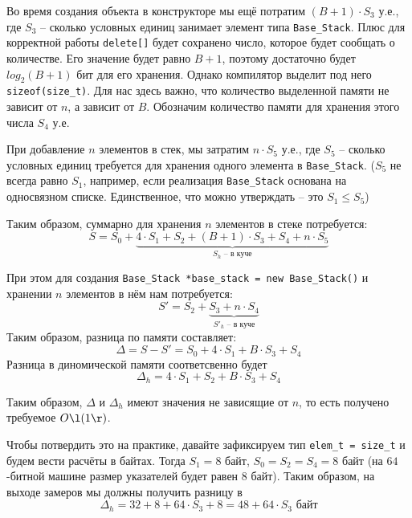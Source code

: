Во время создания объекта в конструкторе мы ещё потратим \((B + 1)\cdot S_3\) у.е., где \(S_3\) -- сколько условных единиц занимает элемент типа \texttt{Base_Stack}. Плюс для корректной работы \texttt{delete[]} будет сохранено число, которое будет сообщать о количестве. Его значение будет равно \(B + 1\), поэтому достаточно будет \(log_2(B + 1)\) бит для его хранения. Однако компилятор выделит под него \texttt{sizeof(size_t)}. Для нас здесь важно, что количество выделенной памяти не зависит от \(n\), а зависит от \(B\). Обозначим количество памяти для хранения этого числа \(S_4\) у.е.

При добавление \(n\) элементов в стек, мы затратим \(n\cdot S_5\) у.е., где \(S_5\) -- сколько условных единиц требуется для хранения одного элемента в \texttt{Base_Stack}. (\(S_5\) не всегда равно \(S_1\), например, если реализация \texttt{Base_Stack} основана на односвязном списке. Единственное, что можно утверждать -- это \(S_1 \leq S_5\))

Таким образом, суммарно для хранения \(n\) элементов в стеке потребуется:
\begin{dmath*}
  S = S_0 + \underbrace{4\cdot S_1 + S_2 + (B + 1)\cdot S_3 + S_4 + n \cdot S_5}_{S_h \text{ -- в куче}}
\end{dmath*}

При этом для создания \texttt{Base_Stack *base_stack = new Base_Stack()} и хранении \(n\) элементов в нём нам потребуется:
\begin{dmath*}
  S' = S_2 + \underbrace{S_3 + n\cdot S_4}_{S'_h \text{ -- в куче}}
\end{dmath*}
Таким образом, разница по памяти составляет:
\begin{dmath*}
  \Delta = S - S' = S_0 + 4\cdot S_1 + B \cdot S_3 + S_4 
\end{dmath*}
Разница в диномической памяти соответсвенно будет 
\begin{dmath*}
  \Delta_h =  4\cdot S_1 + S_2 + B \cdot S_3 + S_4
\end{dmath*}

Таким образом, \(\Delta\) и \(\Delta_{h}\) имеют значения не зависящие от \(n\), то есть получено требуемое \(O\l(1\r)\).

Чтобы потвердить это на практике, давайте зафиксируем тип \texttt{elem_t = size_t} и будем вести расчёты в байтах. Тогда \(S_1 = 8\) байт, \(S_0 = S_2 = S_4 = 8 \) байт (на \(64\)-битной машине размер указателей будет равен \(8\) байт). Таким образом, на выходе замеров мы должны получить разницу в 
\begin{dmath}[labelN={5}]
  \Delta_h = 32 + 8 + 64\cdot S_3 + 8 = 48 +  64\cdot S_3 \text{ байт}
\end{dmath}


